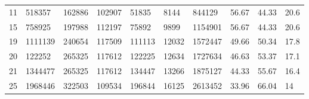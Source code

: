 \begin{landscape}
\begin{table}[tbp]
{\begin{tabular}{@{}llllllllll@{}}
11          & 518357                                                                       & 162886                                                                    & 102907              & 51835                                                                     & 8144                                                                    & 844129       & 56.67                    & 44.33                    & 20.6                           \\
15          & 758925                                                                       & 197988                                                                    & 112197              & 75892                                                                     & 9899                                                                    & 1154901      & 56.67                    & 44.33                    & 20.6                           \\
19          & 1111139                                                                      & 240654                                                                    & 117509              & 111113                                                                    & 12032                                                                   & 1572447      & 49.66                    & 50.34                    & 17.8                           \\
20          & 122252                                                                       & 265325                                                                    & 117612              & 122225                                                                    & 12634                                                                   & 1727634      & 46.63                    & 53.37                    & 17.1                           \\
21          & 1344477                                                                      & 265325                                                                    & 117612              & 134447                                                                    & 13266                                                                   & 1875127      & 44.33                    & 55.67                    & 16.4                           \\
25          & 1968446                                                                      & 322503                                                                    & 109534              & 196844                                                                    & 16125                                                                   & 2613452      & 33.96                    & 66.04                    & 14                             \\

\end{tabular}}
\end{table}
\end{landscape}
